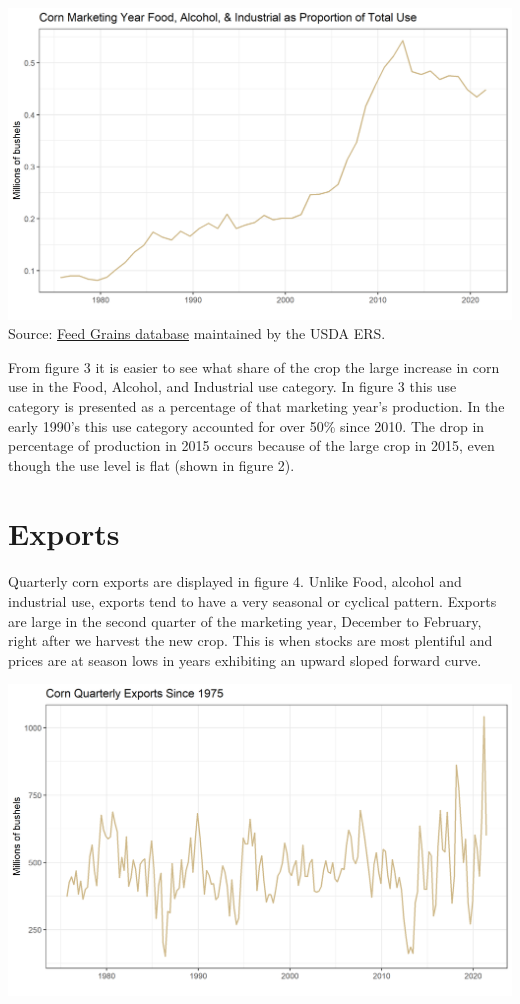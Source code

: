 \documentclass[
  letterpaper,
  DIV=11,
  numbers=noendperiod]{scrreprt}
\begin{document}
\includegraphics{assets/ForecastingUseof-CornUseCategoriesFoodAlcoholIndPropofUse.png}
Source:
\href{http://www.ers.usda.gov/data-products/feed-grains-database/feed-grains-yearbook-tables.aspx\#26780}{Feed
Grains database} maintained by the USDA ERS.

From figure 3 it is easier to see what share of the crop the large
increase in corn use in the Food, Alcohol, and Industrial use category.
In figure 3 this use category is presented as a percentage of that
marketing year's production. In the early 1990's this use category
accounted for over 50\% since 2010. The drop in percentage of production
in 2015 occurs because of the large crop in 2015, even though the use
level is flat (shown in figure 2).

\section{Exports}\label{exports}

Quarterly corn exports are displayed in figure 4. Unlike Food, alcohol
and industrial use, exports tend to have a very seasonal or cyclical
pattern. Exports are large in the second quarter of the marketing year,
December to February, right after we harvest the new crop. This is when
stocks are most plentiful and prices are at season lows in years
exhibiting an upward sloped forward curve.

\includegraphics{assets/ForecastingUseof-CornUseCategoriesExports.png}
\end{document}

